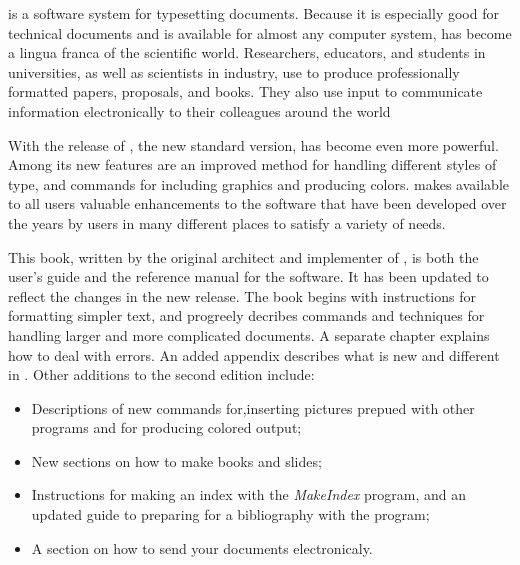 \begin{titlepage}
\ltx{} is a software system for typesetting documents. Because it is especially good for technical 
documents and is available for almost any computer system, \ltx{} has become a lingua franca of the 
scientific world. Researchers, educators, and students in universities, as well as scientists in 
industry, use \ltx{} to produce professionally formatted papers, proposals, and books. They also 
use \ltx{} input to communicate information electronically to their colleagues around the world

With the release of \ltxee{}, the new standard version, \ltx{} has become even more powerful. 
Among its new features are an improved method for handling different styles of type, and commands 
for including graphics and producing colors. \ltxee{} makes available to 
all \ltx{} users valuable enhancements to the software that have been developed over the years 
by users in many different places to satisfy a variety of needs. 

This book, written by the original architect and implementer of \ltx{}, is both the user's guide
and the reference manual for the software. It has been updated to reflect the changes in the new
release. The book begins with instructions for formatting simpler text, and progreely decribes
commands and techniques for handling larger and more complicated documents. A separate chapter
explains how to deal with errors. An added appendix describes what is new and different in \ltxee{}.
Other additions to the second edition include:

\begin{itemize}
  \item Descriptions of new commands for,inserting pictures prepued with other programs
    and for producing colored output;
  \item New sections on how to make books and slides;
  \item Instructions for making an index with the \textit{MakeIndex} program, and an updated 
    guide to preparing for a bibliography with the  program;
  \item A section on how to send your \ltx{} documents electronicaly.
\end{itemize}


\end{titlepage}
